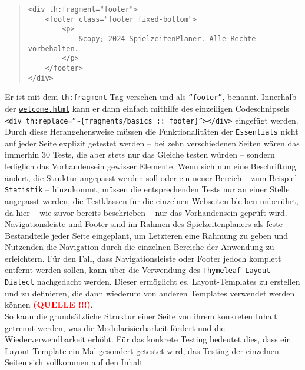 \begin{quote}
\begin{verbatim}
<div th:fragment="footer">
    <footer class="footer fixed-bottom">
        <p>
            &copy; 2024 SpielzeitenPlaner. Alle Rechte vorbehalten. 
        </p>
    </footer>
</div>
\end{verbatim}
\end{quote}

Er ist mit dem \texttt{th:fragment}-Tag versehen und als \texttt{``footer''}, 
benannt. Innerhalb der \href{https://github.com/FlorianOhmes/bat_spielzeitenplaner/blob/main/spielzeitenplaner/src/main/resources/templates/welcome.html}{\texttt{welcome.html}}
kann er dann einfach mithilfe des einzeiligen Codeschnipsels
\texttt{<div \linebreak th:replace=``\textasciitilde\{fragments/basics :: footer\}''></div>}
eingefügt werden. \\ 
Durch diese Herangehensweise müssen die Funktionalitäten der \texttt{Essentials} 
nicht auf jeder Seite explizit getestet werden -- bei zehn verschiedenen Seiten 
wären das immerhin 30 Tests, die aber stets nur das Gleiche testen würden -- 
sondern lediglich das Vorhandensein gewisser Elemente. Wenn sich nun eine 
Beschriftung ändert, die Struktur angepasst werden soll oder ein neuer Bereich -- 
zum Beispiel \texttt{Statistik} -- hinzukommt, müssen die entsprechenden Tests nur 
an einer Stelle angepasst werden, die Testklassen für die einzelnen Webseiten 
bleiben unberührt, da hier -- wie zuvor bereits beschrieben -- nur das 
Vorhandensein geprüft wird. \\ 
Navigationsleiste und Footer sind im Rahmen des Spielzeitenplaners als feste 
Bestandteile jeder Seite eingeplant, um Letzteren eine Rahmung zu geben und 
Nutzenden die Navigation durch die einzelnen Bereiche der Anwendung zu erleichtern. 
Für den Fall, dass Navigationsleiste oder Footer jedoch komplett entfernt werden 
sollen, kann über die Verwendung des \texttt{Thymeleaf Layout Dialect} nachgedacht 
werden. Dieser ermöglicht es, Layout-Templates zu erstellen und zu definieren, die 
dann wiederum von anderen Templates verwendet werden können \textbf{\textcolor{red}{(QUELLE !!!)}}. \\ 
So kann die grundsätzliche Struktur einer Seite von ihrem konkreten Inhalt getrennt 
werden, was die Modularisierbarkeit fördert und die Wiederverwendbarkeit erhöht. 
Für das konkrete Testing bedeutet dies, dass ein Layout-Template ein Mal gesondert 
getestet wird, das Testing der einzelnen Seiten sich vollkommen auf den Inhalt 
